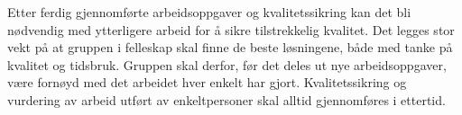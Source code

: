 Etter ferdig gjennomførte arbeidsoppgaver og kvalitetssikring kan det bli nødvendig med ytterligere arbeid for å sikre tilstrekkelig kvalitet. Det legges stor vekt på at gruppen i felleskap skal finne de beste løsningene, både med tanke på kvalitet og tidsbruk. Gruppen skal derfor, før det deles ut nye arbeidsoppgaver, være fornøyd med det arbeidet hver enkelt har gjort. Kvalitetssikring og vurdering av arbeid utført av enkeltpersoner skal alltid gjennomføres i ettertid.
